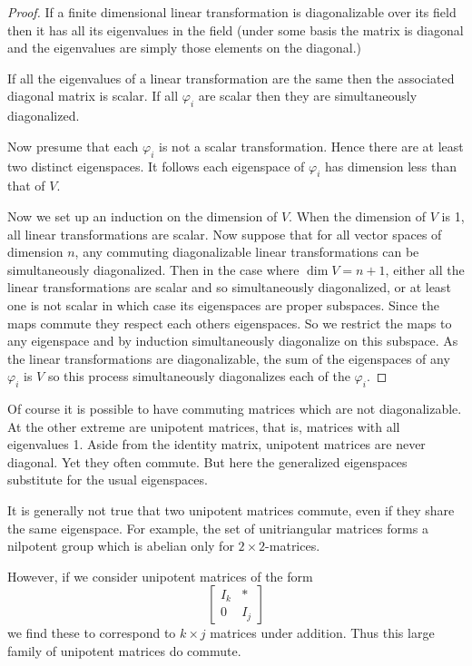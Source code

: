 \documentclass[12pt]{article}
\begin{document}
\begin{proof}
If a finite dimensional linear transformation is diagonalizable
over its field then it has all its eigenvalues in the field 
(under some basis the matrix is diagonal and the eigenvalues
are simply those elements on the diagonal.)  

If all the eigenvalues of a linear transformation are the same then
the associated diagonal matrix is scalar.  If all $\varphi_i$
are scalar then they are simultaneously diagonalized.

Now presume that each $\varphi_i$ is
not a scalar transformation.  Hence there are at least two distinct eigenspaces. It follows each eigenspace of $\varphi_i$ has dimension 
less than that of $V$.

Now we set up an induction on the dimension of $V$.  When the 
dimension of $V$ is 1, all linear transformations are scalar.  
Now suppose that for all vector spaces of dimension $n$, any commuting 
diagonalizable linear transformations can be simultaneously 
diagonalized.  Then in the case where $\dim V=n+1$, either all the
linear transformations are scalar and so simultaneously 
diagonalized, or at least one is not scalar in which case its eigenspaces
are proper subspaces.  Since the maps commute they respect each others eigenspaces.  So we restrict the maps to any eigenspace
and by induction simultaneously diagonalize on  this subspace.
As the linear transformations are diagonalizable, the sum of the eigenspaces of any $\varphi_i$ is $V$ so this process simultaneously diagonalizes each of the
$\varphi_i$.
\end{proof}

Of course it is possible to have commuting matrices which are not diagonalizable.  At the other extreme are unipotent matrices, that is, matrices with all eigenvalues 1.  Aside from the identity matrix, unipotent matrices are never diagonal.  Yet they often commute.  But here the generalized eigenspaces substitute for the usual eigenspaces.

It is generally not true that two unipotent matrices commute, even if they share the same eigenspace.  For example, the set of unitriangular matrices forms a nilpotent group which is abelian only for $2\times 2$-matrices.

However, if we consider unipotent matrices of the form
\[\begin{bmatrix} I_k & * \\ 0 & I_j\end{bmatrix}\]
we find these to correspond to $k\times j$ matrices under addition.  Thus this large family of unipotent matrices do commute.
\end{document}

